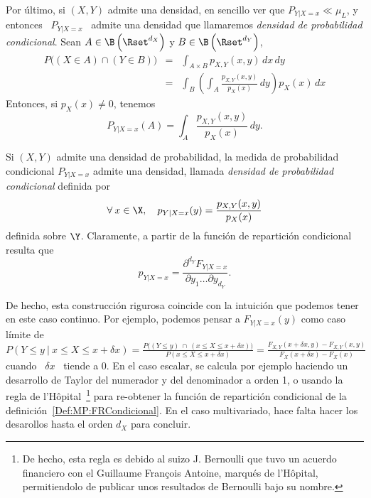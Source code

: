 Por \'ultimo, si $(X,Y)$ admite una densidad, en sencillo ver que $P_{Y|X=x} \ll
\mu_L$,  y entonces  \ $P_{Y|X=x}$  \ admite  una densidad  que  llamaremos {\it
  densidad  de  probabilidad  condicional}.  Sean $A  \in  \B\left(  \Rset^{d_X}
\right)$ y $B \in \B\left( \Rset^{d_Y} \right)$,
%
\begin{eqnarray*}
P\Big( (X \in A) \cap (Y \in B) \Big) & = & \int_{A \times B} p_{X,Y}(x,y) \, dx
\, dy\\[2mm]
%
& = & \int_B \left( \int_A \frac{p_{X,Y}(x,y)}{p_X(x)} \, dy \right) p_X(x) \, dx
\end{eqnarray*}
%
Entonces, si $p_X(x) \ne 0$, tenemos
%
\[
P_{Y|X=x}(A) = \int_A \frac{p_{X,Y}(x,y)}{p_X(x)} \, dy.
\]
%
\begin{teorema}
\label{Def:MP:DensidadCondicional}
%
  Si  $(X,Y)$ admite  una densidad  de probabilidad,  la medida  de probabilidad
  condicional  $P_{Y|X=x}$  admite  una   densidad,  llamada  {\it  densidad  de
    probabilidad condicional} definida por
  \[
  \forall \: x \in \X, \quad p_{Y|X=x}(y) = \frac{p_{X,Y}(x,y)}{p_X(x)}
  \]
  definida  sobre $\Y$. Claramente,  a partir de  la funci\'on  de repartici\'on
  condicional resulta que
  \[
  p_{Y|X=x} = \frac{\partial^{d_Y}  F_{Y|X=x}}{\partial y_1 \ldots \partial y_{d_Y}}.
  \]
\end{teorema}

De hecho, esta  construcci\'on rigurosa coincide con la  intuici\'on que podemos
tener en este  caso continuo. Por ejemplo, podemos  pensar a $F_{Y|X=x}(y)$ como
caso l\'imite de $\displaystyle P\left( Y \le y \: \Big| \: x \le X \le x+\delta
  x \right) = \frac{P\big( \left( Y \le y  \right) \: \cap \: \left( x \le X \le
    x+\delta  x  \right)  \big)}{P\left( x  \le  X  \le  x+\delta x  \right)}  =
\frac{F_{X,Y}(x+\delta  x ,  y) -  F_{X,Y}(x  , y)}{F_X(x+\delta  x) -  F_X(x)}$
cuando \ $\delta  x$ \ tiende a 0.   En el caso escalar, se  calcula por ejemplo
haciendo un  desarrollo de Taylor del numerador  y del denominador a  orden 1, o
usando la regla de l'H\^opital~\footnote{De hecho, esta regla es debido al suizo
  J.  Bernoulli  que tuvo  un acuerdo financiero  con el  Guillaume Fran\c{c}ois
  Antoine, marqu\'es  de l'H\^opital, permitiendolo de  publicar unos resultados
  de Bernoulli bajo  su nombre.}  para re-obtener la  funci\'on de repartici\'on
condicional   de  la   definici\'on~\ref{Def:MP:FRCondicional}.    En  el   caso
multivariado,  hace  falta  hacer  los  desarollos hasta  el  orden  $d_X$  para
concluir.

